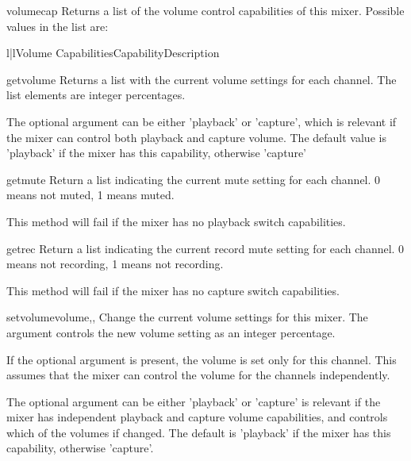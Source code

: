 \begin{methoddesc}[Mixer]{volumecap}{}
Returns a list of the volume control capabilities of this mixer. Possible values in
the list are:

\begin{tableii}{l|l}{Volume Capabilities}{Capability}{Description}
\end{tableii}

\end{methoddesc}

\begin{methoddesc}[Mixer]{getvolume}{}
Returns a list with the current volume settings for each channel. The list elements
are integer percentages.

The optional  argument can be either 'playback' or 'capture', which is relevant
if the mixer can control both playback and capture volume. The default value is 'playback'
if the mixer has this capability, otherwise 'capture'

\end{methoddesc}

\begin{methoddesc}[Mixer]{getmute}{}
Return a list indicating the current mute setting for each channel. 0 means not muted, 1 means muted.

This method will fail if the mixer has no playback switch capabilities.
\end{methoddesc}

\begin{methoddesc}[Mixer]{getrec}{}
Return a list indicating the current record mute setting for each channel. 0 means not recording, 1 
means not recording.

This method will fail if the mixer has no capture switch capabilities.
\end{methoddesc}

\begin{methoddesc}[Mixer]{setvolume}{volume,,}
Change the current volume settings for this mixer. The  argument controls
the new volume setting as an integer percentage.

If the optional argument  is present, the volume is set only for this channel. This
assumes that the mixer can control the volume for the channels independently.

The optional  argument can be either 'playback' or 'capture' is relevant if the mixer
has independent playback and capture volume capabilities, and controls which of the volumes
if changed. The default is 'playback' if the mixer has this capability, otherwise 'capture'.
\end{methoddesc}

